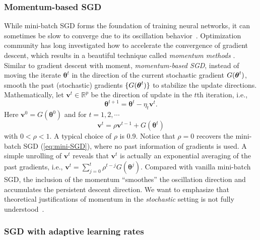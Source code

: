 \subsubsection{Momentum-based SGD}
While mini-batch SGD forms the foundation
of training neural networks, it can sometimes be slow to converge
due to its oscillation behavior~\citep{sutskever2013importance}. Optimization community has long investigated
how to accelerate the convergence of gradient descent,
which results in a beautiful technique called \emph{momentum methods}
\citep{polyak1964some,nesterov1983method}. Similar to gradient descent with moment, \emph{momentum-based SGD}, instead of moving the iterate
$\bm{\theta}^{t}$ in the direction of the current stochastic gradient $G(\text{\boldmath $\theta$}^t)$, smooth the past (stochastic) gradients $\{G(\text{\boldmath $\theta$}^t)\}$ to stabilize the update directions. Mathematically,
let $\bm{v}^{t}\in\mathbb{R}^{p}$ be the direction of update in the
$t$th iteration, i.e.,
\[
\bm{\theta}^{t+1}=\bm{\theta}^{t}-\eta_{t}\bm{v}^{t}.
\]
Here $\bm{v}^{0}=G(\bm{\theta}^{0})$ and for $t=1,2,\cdots$
\begin{equation} \label{eq6.6}
\bm{v}^{t}=\rho\bm{v}^{t-1}+G(\bm{\theta}^{t})
\end{equation}
with $0<\rho<1$. A typical choice of $\rho$ is 0.9. Notice
that $\rho=0$ recovers the mini-batch SGD (\ref{eq:mini-SGD}),
where no past information of gradients is used. A simple unrolling
of $\bm{v}^{t}$ reveals that $\bm{v}^{t}$ is actually an exponential
averaging of the past gradients, i.e., $\bm{v}^{t}=\sum_{j=0}^{t}\rho^{t-j}G(\bm{\theta}^{j}).$
Compared with vanilla mini-batch SGD, the inclusion of the momentum
``smoothes'' the oscillation direction and accumulates the persistent
descent direction. We want to emphasize that theoretical justifications of momentum in the \emph{stochastic} setting is not fully understood~\citep{kidambi2018insufficiency, jain2017accelerating}.


\subsubsection{SGD with adaptive learning rates}

